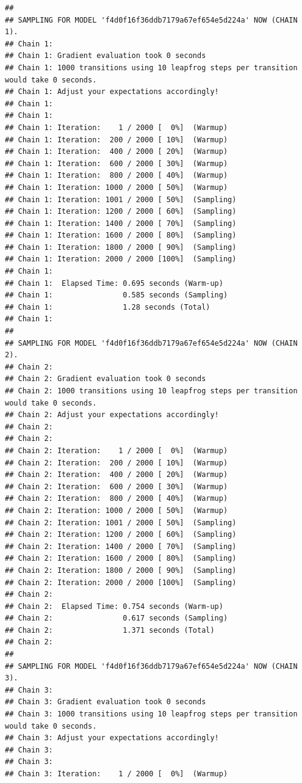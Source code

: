 \documentclass[
]{book}
\begin{document}
\begin{verbatim}
## 
## SAMPLING FOR MODEL 'f4d0f16f36ddb7179a67ef654e5d224a' NOW (CHAIN 1).
## Chain 1: 
## Chain 1: Gradient evaluation took 0 seconds
## Chain 1: 1000 transitions using 10 leapfrog steps per transition would take 0 seconds.
## Chain 1: Adjust your expectations accordingly!
## Chain 1: 
## Chain 1: 
## Chain 1: Iteration:    1 / 2000 [  0%]  (Warmup)
## Chain 1: Iteration:  200 / 2000 [ 10%]  (Warmup)
## Chain 1: Iteration:  400 / 2000 [ 20%]  (Warmup)
## Chain 1: Iteration:  600 / 2000 [ 30%]  (Warmup)
## Chain 1: Iteration:  800 / 2000 [ 40%]  (Warmup)
## Chain 1: Iteration: 1000 / 2000 [ 50%]  (Warmup)
## Chain 1: Iteration: 1001 / 2000 [ 50%]  (Sampling)
## Chain 1: Iteration: 1200 / 2000 [ 60%]  (Sampling)
## Chain 1: Iteration: 1400 / 2000 [ 70%]  (Sampling)
## Chain 1: Iteration: 1600 / 2000 [ 80%]  (Sampling)
## Chain 1: Iteration: 1800 / 2000 [ 90%]  (Sampling)
## Chain 1: Iteration: 2000 / 2000 [100%]  (Sampling)
## Chain 1: 
## Chain 1:  Elapsed Time: 0.695 seconds (Warm-up)
## Chain 1:                0.585 seconds (Sampling)
## Chain 1:                1.28 seconds (Total)
## Chain 1: 
## 
## SAMPLING FOR MODEL 'f4d0f16f36ddb7179a67ef654e5d224a' NOW (CHAIN 2).
## Chain 2: 
## Chain 2: Gradient evaluation took 0 seconds
## Chain 2: 1000 transitions using 10 leapfrog steps per transition would take 0 seconds.
## Chain 2: Adjust your expectations accordingly!
## Chain 2: 
## Chain 2: 
## Chain 2: Iteration:    1 / 2000 [  0%]  (Warmup)
## Chain 2: Iteration:  200 / 2000 [ 10%]  (Warmup)
## Chain 2: Iteration:  400 / 2000 [ 20%]  (Warmup)
## Chain 2: Iteration:  600 / 2000 [ 30%]  (Warmup)
## Chain 2: Iteration:  800 / 2000 [ 40%]  (Warmup)
## Chain 2: Iteration: 1000 / 2000 [ 50%]  (Warmup)
## Chain 2: Iteration: 1001 / 2000 [ 50%]  (Sampling)
## Chain 2: Iteration: 1200 / 2000 [ 60%]  (Sampling)
## Chain 2: Iteration: 1400 / 2000 [ 70%]  (Sampling)
## Chain 2: Iteration: 1600 / 2000 [ 80%]  (Sampling)
## Chain 2: Iteration: 1800 / 2000 [ 90%]  (Sampling)
## Chain 2: Iteration: 2000 / 2000 [100%]  (Sampling)
## Chain 2: 
## Chain 2:  Elapsed Time: 0.754 seconds (Warm-up)
## Chain 2:                0.617 seconds (Sampling)
## Chain 2:                1.371 seconds (Total)
## Chain 2: 
## 
## SAMPLING FOR MODEL 'f4d0f16f36ddb7179a67ef654e5d224a' NOW (CHAIN 3).
## Chain 3: 
## Chain 3: Gradient evaluation took 0 seconds
## Chain 3: 1000 transitions using 10 leapfrog steps per transition would take 0 seconds.
## Chain 3: Adjust your expectations accordingly!
## Chain 3: 
## Chain 3: 
## Chain 3: Iteration:    1 / 2000 [  0%]  (Warmup)

\end{verbatim}
\end{document}
